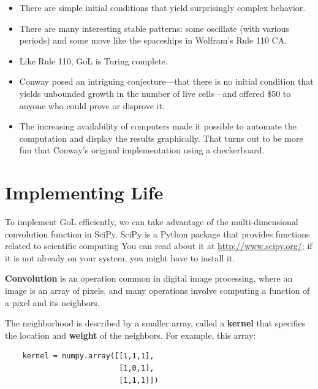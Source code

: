 \documentclass[10pt]{book}
\begin{document}
\begin{itemize}

\item There are simple initial conditions that yield
surprisingly complex behavior.

\item There are many interesting stable patterns: some
oscillate (with various periods) and some move like the
spaceships in Wolfram's Rule 110 CA.

\item Like Rule 110, GoL is Turing complete.

\item Conway posed an intriguing conjecture---that there is
no initial condition that yields unbounded growth in the number
of live cells---and offered \$50 to anyone who could prove
or disprove it.

\item The increasing availability of computers made it possible
to automate the computation and display the results graphically.
That turns out to be more fun that Conway's original implementation
using a checkerboard.

\end{itemize}


\section{Implementing Life}

To implement GoL efficiently, we can take advantage of the
multi-dimensional convolution function in SciPy.  SciPy is a Python
package that provides functions related to scientific computing
You can read about it at \url{http://www.scipy.org/}; if it is not
already on your system, you might have to install it.

{\bf Convolution} is an operation common in digital image processing,
where an image is an array of pixels, and many operations involve
computing a function of a pixel and its neighbors.

The neighborhood is described by a smaller array, called a {\bf kernel}
that specifies the location and {\bf weight} of the neighbors.  For
example, this array:

\begin{verbatim}
    kernel = numpy.array([[1,1,1],
                          [1,0,1],
                          [1,1,1]])
\end{verbatim}
\end{document}
